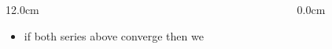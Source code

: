 \begin{frame}
\begin{columns}
\begin{column}{12.0cm}
\begin{itemize}
\begin{itemize}
\begin{center}
			\end{center}
			\vspace{0.2cm}
				\item if both series above converge then we \onslide<14->{\textcolor{blue}{include both endpoints}}
				\vspace{0.2cm}
			\begin{center}
			\end{center}
		\end{itemize}
	\end{itemize}
\end{column}
\begin{column}{0.0cm}\end{column}
\end{columns}
\end{frame}

